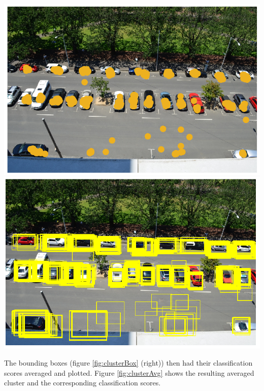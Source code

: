 \documentclass[man]{apa7}
\begin{document}
\begin{minipage}{\linewidth}
  \includegraphics[height=\textheight/4,width=\textwidth/2]{figures/clusterDot.png}
  \includegraphics[height=\textheight/4,width=\textwidth/2]{figures/clusterBox.png}
  \label{fig:clusterBox}
\end{minipage}

The bounding boxes (figure \ref{fig:clusterBox} (right)) then had their classification scores averaged and plotted. Figure \ref{fig:clusterAvg} shows the resulting averaged cluster and the corresponding classification scores.
\end{document}

